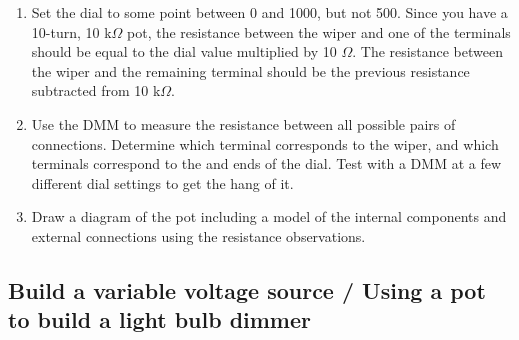 \documentclass[10pt]{PhysLab1C} %
\begin{document}
\begin{enumerate}
\def\labelenumi{\arabic{enumi}.}
\item
  Set the dial to some point between 0 and 1000, but not 500. Since you
  have a 10-turn, 10 k$\Omega$ pot, the resistance between the wiper and one of
  the terminals should be equal to the dial value multiplied by 10 $\Omega$.
  The resistance between the wiper and the remaining terminal should be
  the previous resistance subtracted from 10 k$\Omega$.
\item
  Use the DMM to measure the resistance between all possible pairs of
  connections. Determine which terminal corresponds to the wiper, and
  which terminals correspond to the \textquotesingle{}
  and \textquotesingle{} ends of the dial. Test with
  a DMM at a few different dial settings to get the hang of it.
\item
  Draw a diagram of the pot including a model of the internal components
  and external connections using the resistance observations.
\end{enumerate}

\subsection{Build a variable voltage source / Using a pot to build a light bulb dimmer}
\end{document}
